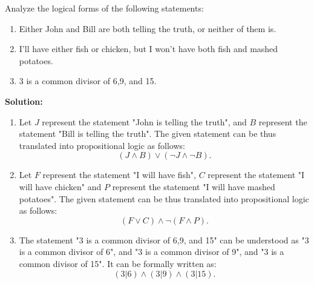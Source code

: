 Analyze the logical forms of the following statements:
\begin{enumerate}[label=(\alph*)]
    \item Either John and Bill are both telling the truth, or neither of them is.
    \item I'll have either fish or chicken, but I won't have both fish and mashed potatoes.
    \item 3 is a common divisor of 6,9, and 15.
\end{enumerate}

\textbf{Solution:}
\begin{enumerate}[label=(\alph*)]
    \item Let $J$ represent the statement "John is telling the truth", and $B$ represent the statement "Bill is telling the truth". The given statement can be thus translated into propositional logic as follows:
    $$(J \wedge B) \vee (\neg J \wedge \neg B).$$

    \item Let $F$ represent the statement "I will have fish", $C$ represent the statement "I will have chicken" and $P$ represent the statement "I will have mashed potatoes". The given statement can be thus translated into propositional logic as follows:
    $$(F \vee C) \wedge \neg (F \wedge P).$$

    \item The statement "3 is a common divisor of 6,9, and 15" can be understood as "3 is a common divisor of 6", and "3 is a common divisor of 9", and "3 is a common divisor of 15". It can be formally written as:
    $$(3 | 6) \wedge (3 | 9) \wedge (3 | 15).$$
\end{enumerate}

\pagebreak